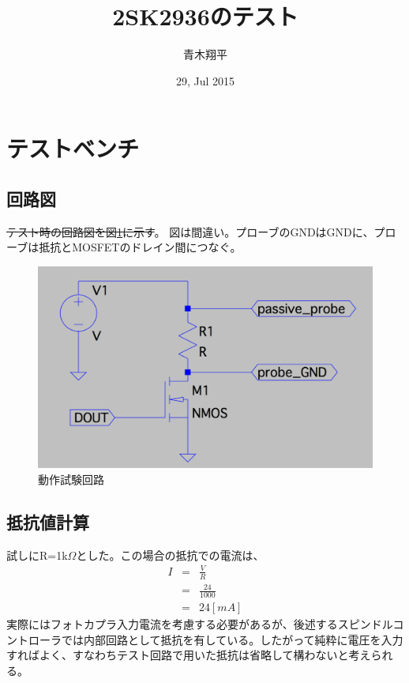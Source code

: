 \documentclass[]{jsarticle}
\begin{document}
\title{2SK2936のテスト}
\author{青木翔平}
\date{29, Jul 2015}
\maketitle

\section{テストベンチ}
\subsection{回路図}
\sout{テスト時の回路図を図\ref{testbench}に示す}。
図は間違い。プローブのGNDはGNDに、プローブは抵抗とMOSFETのドレイン間につなぐ。




\begin{figure}[htbp]
\centering
\includegraphics[width=130mm]{./image/testbench.pdf}
\caption{動作試験回路}
\label{testbench}
\end{figure}

\subsection{抵抗値計算}
試しにR=1k$\Omega$とした。この場合の抵抗での電流は、
\begin{eqnarray*}
I & = &  \frac{V}{R} \\
   & = & \frac{24}{1000} \\
   & = & 24 [mA]
\end{eqnarray*}
実際にはフォトカプラ入力電流を考慮する必要があるが、後述するスピンドルコントローラでは内部回路として抵抗を有している。したがって純粋に電圧を入力すればよく、すなわちテスト回路で用いた抵抗は省略して構わないと考えられる。
\end{document}
